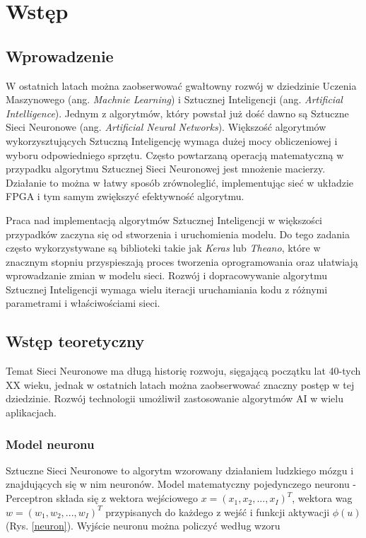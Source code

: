 \newpage %
\cleardoublepage %
\pagestyle{headings}
\section{Wstęp}

\subsection{Wprowadzenie}

W ostatnich latach można zaobserwować gwałtowny rozwój w dziedzinie 
Uczenia Maszynowego (ang. \emph{Machnie Learning}) i Sztucznej Inteligencji 
(ang. \emph{Artificial Intelligence}). Jednym z algorytmów, który powstał już 
dość dawno są Sztuczne Sieci Neuronowe (ang. \emph{Artificial Neural 
Networks}). 
Większość algorytmów wykorzysztujących Sztuczną Inteligencję wymaga dużej mocy 
obliczeniowej i wyboru odpowiedniego sprzętu. Często powtarzaną operacją matematyczną 
w przypadku algorytmu Sztucznej Sieci Neuronowej jest mnożenie macierzy.
Działanie to można w łatwy sposób zrównoleglić, implementując sieć w układzie 
FPGA i tym samym zwiększyć efektywność algorytmu.

Praca nad implementacją algorytmów Sztucznej Inteligencji w większości 
przypadków zaczyna się od stworzenia i uruchomienia modelu. Do tego zadania 
często wykorzystywane są biblioteki takie jak \emph{Keras} lub \emph{Theano}, które 
w znacznym stopniu przyspieszają proces tworzenia oprogramowania oraz 
ułatwiają wprowadzanie zmian w modelu sieci. Rozwój i dopracowywanie 
algorytmu Sztucznej Inteligencji wymaga wielu iteracji uruchamiania kodu 
z różnymi parametrami i właściwościami sieci.

\subsection{Wstęp teoretyczny}

Temat Sieci Neuronowe ma długą historię rozwoju, sięgającą początku lat 
40-tych XX wieku, jednak w ostatnich latach można zaobserwować znaczny postęp w tej 
dziedzinie\cite{Kriesel2007NeuralNetworks}. Rozwój technologii umożliwił zastosowanie
algorytmów AI w wielu aplikacjach. 

\subsubsection{Model neuronu}
Sztuczne Sieci Neuronowe to algorytm wzorowany działaniem ludzkiego mózgu 
i znajdujących się w nim neuronów. Model matematyczny pojedynczego 
neuronu - Perceptron \cite{Omondi2006FPGAIO} składa się z wektora wejściowego 
$x = (x_1, x_2,...,x_I)^T$, wektora wag $w = (w_1, w_2,...,w_I)^T$ 
przypisanych do każdego z wejść i funkcji aktywacji $\phi(u)$ 
(Rys. \ref{neuron}). Wyjście neuronu można policzyć według wzoru

